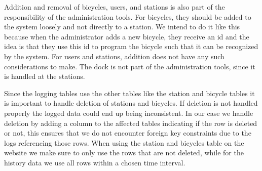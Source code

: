 Addition and removal of bicycles, users, and stations is also part of the responsibility of the administration tools. 
For bicycles, they should be added to the system loosely and not directly to a station.
We intend to do it like this because when the administrator adds a new bicycle, they receive an id and the idea is that they use this id to program the bicycle such that it can be recognized by the system.
For users and stations, addition does not have any such considerations to make. 
The dock is not part of the administration tools, since it is handled at the stations.

Since the logging tables use the other tables like the station and bicycle tables it is important to handle deletion of stations and bicycles. 
If deletion is not handled properly the logged data could end up being inconsistent. 
In our case we handle deletion by adding a column to the affected tables indicating if the row is deleted or not, this ensures that we do not encounter foreign key constraints due to the logs referencing those rows. 
When using the station and bicycles table on the website we make sure to only use the rows that are not deleted, while for the history data we use all rows within a chosen time interval.
